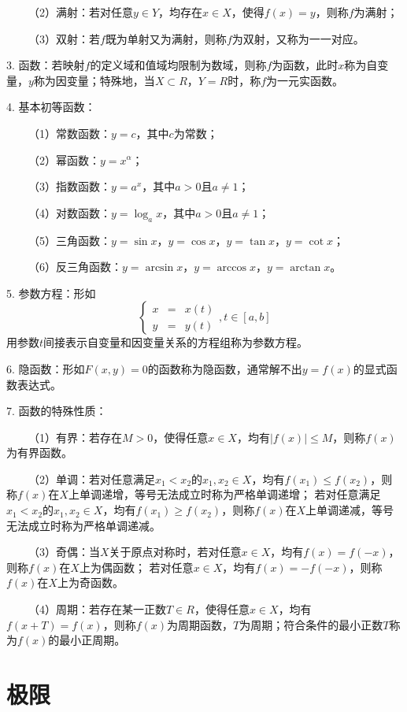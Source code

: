 ~~~~（2）满射：若对任意$y\in Y$，均存在$x \in X$，使得$f(x)=y$，则称$f$为满射；

~~~~（3）双射：若$f$既为单射又为满射，则称$f$为双射，又称为一一对应。

3. 函数：若映射$f$的定义域和值域均限制为数域，则称$f$为函数，此时$x$称为自变量，$y$称为因变量；特殊地，当$X \subset R$，$Y=R$时，称$f$为一元实函数。

4. 基本初等函数：

~~~~（1）常数函数：$y=c$，其中$c$为常数；

~~~~（2）幂函数：$y=x^\alpha$；

~~~~（3）指数函数：$y=a^x$，其中$a>0$且$a\neq 1$；

~~~~（4）对数函数：$y=\log_a x$，其中$a>0$且$a \neq 1$；

~~~~（5）三角函数：$y=\sin x$，$y=\cos x$，$y=\tan x$，$y=\cot x$；

~~~~（6）反三角函数：$y=\arcsin x$，$y=\arccos x$，$y=\arctan x$。

5. 参数方程：形如
\begin{equation*}
    \left\{\begin{aligned}
        x&=&x(t)\\
        y&=&y(t)
    \end{aligned}\right. , t\in[a,b]
\end{equation*}用参数$t$间接表示自变量和因变量关系的方程组称为参数方程。

6. 隐函数：形如$F(x,y)=0$的函数称为隐函数，通常解不出$y=f(x)$的显式函数表达式。

7. 函数的特殊性质：

~~~~（1）有界：若存在$ M>0$，使得任意$x \in X$，均有$|f(x)|\leqslant M$，则称$f(x)$为有界函数。

~~~~（2）单调：若对任意满足$x_1<x_2$的$x_1,x_2 \in X$，均有$f(x_1)\leqslant f(x_2)$，则称$f(x)$在$X$上单调递增，等号无法成立时称为严格单调递增；
若对任意满足$x_1<x_2$的$x_1,x_2 \in X$，均有$f(x_1)\geqslant f(x_2)$，则称$f(x)$在$X$上单调递减，等号无法成立时称为严格单调递减。

~~~~（3）奇偶：当$X$关于原点对称时，若对任意$x \in X$，均有$f(x)=f(-x)$，则称$f(x)$在$X$上为偶函数；
若对任意$x \in X$，均有$f(x)=-f(-x)$，则称$f(x)$在$X$上为奇函数。

~~~~（4）周期：若存在某一正数$T\in R$，使得任意$x \in X$，均有$f(x+T)=f(x)$，则称$f(x)$为周期函数，$T$为周期；符合条件的最小正数$T$称为$f(x)$的最小正周期。

\section{极限}

